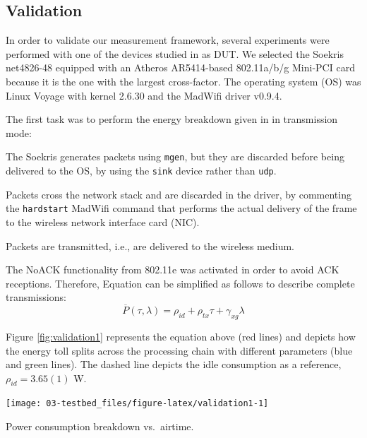 \documentclass[twoside,nohyper]{tufte-book}
\makeatletter
\providecommand{\tightlist}{%
  \setlength{\itemsep}{0pt}\setlength{\parskip}{0pt}}
\let\orig@maketag@@@\maketag@@@
\renewcommand{\eqref}[1]{\textup{\let\maketag@@@\orig@maketag@@@\tagform@{\ref{#1}}}}
\def\maketag@@@#1{\hbox{\rlap{\kern\marginparsep\m@th\normalfont#1}\kern1sp}}
\makeatother
\begin{document}
\hypertarget{validation}{%
\subsection{Validation}\label{validation}}

In order to validate our measurement framework, several experiments were performed with one of the devices studied in \citet{Serrano2014} as DUT. We selected the Soekris net4826-48 equipped with an Atheros AR5414-based 802.11a/b/g Mini-PCI card because it is the one with the largest cross-factor. The operating system (OS) was Linux Voyage with kernel 2.6.30 and the MadWifi driver v0.9.4.

The first task was to perform the energy breakdown given in \citet{Serrano2014} in transmission mode:

\begin{description}
\tightlist
\item[User space]
The Soekris generates packets using \texttt{mgen}, but they are discarded before being delivered to the OS, by using the \texttt{sink} device rather than \texttt{udp}.
\item[Kernel space]
Packets cross the network stack and are discarded in the driver, by commenting the \texttt{hardstart} MadWifi command that performs the actual delivery of the frame to the wireless network interface card (NIC).
\item[Wireless NIC]
Packets are transmitted, i.e., are delivered to the wireless medium.
\end{description}

The NoACK functionality from 802.11e was activated in order to avoid ACK receptions. Therefore, Equation \eqref{eq:new-energy-model} can be simplified as follows to describe complete transmissions:
%
\begin{equation*}
 \overline{P}(\tau, \lambda) = \rho_{id} + \rho_{tx}\tau + \gamma_{xg}\lambda
 \label{eq:validation1}
\end{equation*}
%


Figure \ref{fig:validation1} represents the equation above (red lines) and depicts how the energy toll splits across the processing chain with different parameters (blue and green lines). The dashed line depicts the idle consumption as a reference, \(\rho_{id}=3.65(1)\) W.





\begin{marginfigure}[-3.5in]

{\centering \texttt{[image: 03-testbed\_files/figure-latex/validation1-1]} 

}

\caption[Power consumption breakdown vs.~airtime.]{Power consumption breakdown vs.~airtime.}\label{fig:validation1}
\end{marginfigure}
\end{document}
